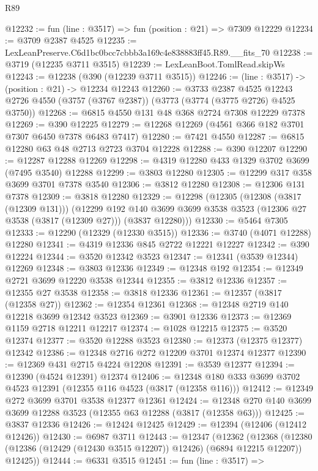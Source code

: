 \begin{lexlean}{R89}
\begin{coremodule}
@12232 := fun (line : @3517) => fun (position : @21) => @7309 @12229
@12234 := @3709 @2387 @4525
@12235 := LexLeanPreserve.C6d1bc0bcc7cbbb3a169c4e838883ff45.R89.__fits_70
@12238 := @3719 (@12235 @3711 @3515)
@12239 := LexLeanBoot.TomlRead.skipWs
@12243 := @12238 (@390 (@12239 @3711 @3515))
@12246 := (line : @3517) -> (position : @21) -> @12234 @12243
@12260 := @3733
    @2387
    @4525
    @12243
    @2726
    @4550
    (@3757 (@3767 @2387))
    (@3773 (@3774 (@3775 @2726) @4525 @3750))
@12268 := @6815 @4550 @131 @48 @368 @2724 @7308 @12229 @7378
@12269 := @390 @12225
@12279 := @12268 @12269 (@4561 @366 @182 @3701 @7307 @6450 @7378 @6483 @7417)
@12280 := @7421 @4550
@12287 := @6815 @12280 @63 @48 @2713 @2723 @3704 @12228
@12288 := @390 @12207
@12290 := @12287 @12288 @12269
@12298 := @4319 @12280 @433 @1329 @3702 @3699 (@7495 @3540) @12288
@12299 := @3803 @12280
@12305 := @12299 @317 @358 @3699 @3701 @7378 @3540
@12306 := @3812 @12280
@12308 := @12306 @131 @7378
@12309 := @3818 @12280
@12329 := @12298
    (@12305
      (@12308 (@3817 (@12309 @131)))
      (@12299
        @192
        @140
        @3699
        @3699
        @3538
        @3523
        (@12306 @27 @3538 (@3817 (@12309 @27)))
        (@3837 @12280)))
@12330 := @5464 @7305
@12333 := @12290 (@12329 (@12330 @3515))
@12336 := @3740 (@4071 @12288) @12280
@12341 := @4319 @12336 @845 @2722 @12221 @12227
@12342 := @390 @12224
@12344 := @3520 @12342 @3523
@12347 := @12341 (@3539 @12344) @12269
@12348 := @3803 @12336
@12349 := @12348 @192
@12354 := @12349 @2721 @3699 @12220 @3538 @12344
@12355 := @3812 @12336
@12357 := @12355 @27 @3538
@12358 := @3818 @12336
@12361 := @12357 (@3817 (@12358 @27))
@12362 := @12354 @12361
@12368 := @12348 @2719 @140 @12218 @3699 @12342 @3523
@12369 := @3901 @12336
@12373 := @12369 @1159 @2718 @12211 @12217
@12374 := @1028 @12215
@12375 := @3520 @12374
@12377 := @3520 @12288 @3523
@12380 := @12373 (@12375 @12377) @12342
@12386 := @12348 @2716 @272 @12209 @3701 @12374 @12377
@12390 := @12369 @431 @2715 @4224 @12208
@12391 := @3539 @12377
@12394 := @12390 (@4524 @12391) @12374
@12406 := @12348 @180 @333 @3699 @3702 @4523 @12391 (@12355 @116 @4523 (@3817 (@12358 @116)))
@12412 := @12349 @272 @3699 @3701 @3538 @12377 @12361
@12424 := @12348 @270 @140 @3699 @3699 @12288 @3523 (@12355 @63 @12288 (@3817 (@12358 @63)))
@12425 := @3837 @12336
@12426 := @12424 @12425
@12429 := @12394 (@12406 (@12412 @12426))
@12430 := @6987 @3711
@12443 := @12347
    (@12362
      (@12368 (@12380 (@12386 (@12429 (@12430 @3515 @12207)) @12426) (@6894 @12215 @12207)) @12425))
@12444 := @6331 @3515
@12451 := fun (line : @3517) =>

\end{coremodule}
\end{lexlean}
